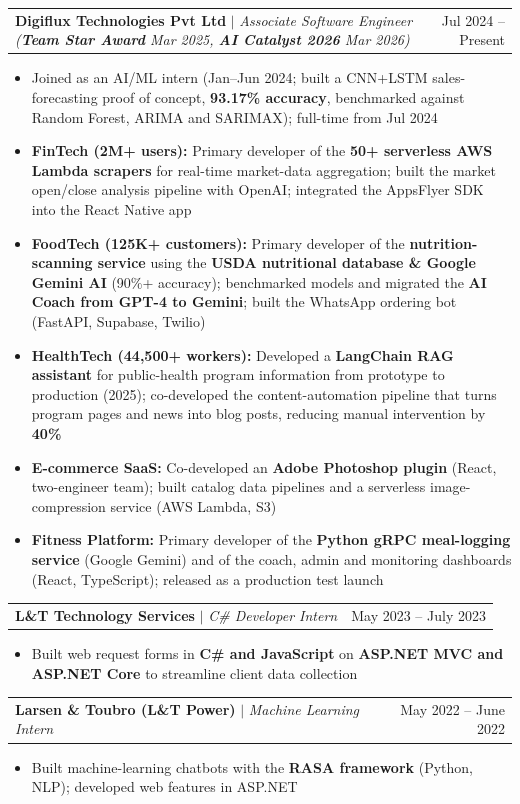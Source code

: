 \documentclass[letterpaper,10pt]{article}
\makeatletter
\newcommand{\resumeItem}[1]{
  \item\small{
    {#1 \vspace{-2pt}}
  }
}
\newcommand{\resumeProjectHeading}[2]{
    \item
    \begin{tabular*}{0.97\textwidth}{l@{\extracolsep{\fill}}r}
      \small#1 & #2 \\
    \end{tabular*}\vspace{-7pt}
}
\newcommand{\resumeItemListStart}{\begin{itemize}}
\newcommand{\resumeItemListEnd}{\end{itemize}\vspace{-5pt}}
\makeatother
\begin{document}
          \resumeProjectHeading
          {\textbf{Digiflux Technologies Pvt Ltd} $|$ \footnotesize\emph{Associate Software Engineer (\textbf{Team Star Award} Mar 2025, \textbf{AI Catalyst 2026} Mar 2026)}}{Jul 2024 -- Present}
          \resumeItemListStart
            \resumeItem{Joined as an AI/ML intern (Jan--Jun 2024; built a CNN+LSTM sales-forecasting proof of concept, \textbf{93.17\% accuracy}, benchmarked against Random Forest, ARIMA and SARIMAX); full-time from Jul 2024}
            \resumeItem{\textbf{FinTech (2M+ users):} Primary developer of the \textbf{50+ serverless AWS Lambda scrapers} for real-time market-data aggregation; built the market open/close analysis pipeline with OpenAI; integrated the AppsFlyer SDK into the React Native app}
            \resumeItem{\textbf{FoodTech (125K+ customers):} Primary developer of the \textbf{nutrition-scanning service} using the \textbf{USDA nutritional database \& Google Gemini AI} (90\%+ accuracy); benchmarked models and migrated the \textbf{AI Coach from GPT-4 to Gemini}; built the WhatsApp ordering bot (FastAPI, Supabase, Twilio)}
            \resumeItem{\textbf{HealthTech (44,500+ workers):} Developed a \textbf{LangChain RAG assistant} for public-health program information from prototype to production (2025); co-developed the content-automation pipeline that turns program pages and news into blog posts, reducing manual intervention by \textbf{40\%}}
            \resumeItem{\textbf{E-commerce SaaS:} Co-developed an \textbf{Adobe Photoshop plugin} (React, two-engineer team); built catalog data pipelines and a serverless image-compression service (AWS Lambda, S3)}
            \resumeItem{\textbf{Fitness Platform:} Primary developer of the \textbf{Python gRPC meal-logging service} (Google Gemini) and of the coach, admin and monitoring dashboards (React, TypeScript); released as a production test launch}
          \resumeItemListEnd

          \resumeProjectHeading
          {\textbf{L\&T Technology Services} $|$ \footnotesize\emph{C\# Developer Intern}}{May 2023 -- July 2023}
          \resumeItemListStart
            \resumeItem{Built web request forms in \textbf{C\# and JavaScript} on \textbf{ASP.NET MVC and ASP.NET Core} to streamline client data collection}
          \resumeItemListEnd

          \resumeProjectHeading
          {\textbf{Larsen \& Toubro (L\&T Power)} $|$ \footnotesize\emph{Machine Learning Intern}}{May 2022 -- June 2022}
          \resumeItemListStart
            \resumeItem{Built machine-learning chatbots with the \textbf{RASA framework} (Python, NLP); developed web features in ASP.NET}
          \resumeItemListEnd
\end{document}
